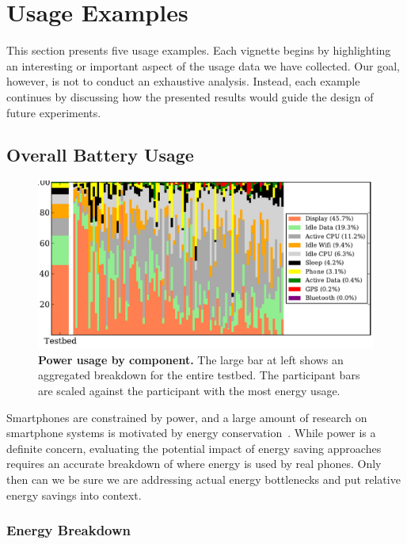 \section{Usage Examples}
\label{sec-usage}

This section presents five \PhoneLab{} usage examples. Each vignette begins by
highlighting an interesting or important aspect of the usage data we have
collected. Our goal, however, is not to conduct an exhaustive analysis.
Instead, each example continues by discussing how the presented results would
guide the design of future \PhoneLab{} experiments.

\subsection{Overall Battery Usage}
\label{subsec-batteryoverview}

\begin{figure}[t]
\includegraphics[width=\textwidth]{./figures/power/breakdown/graph.pdf}
\caption{\textbf{Power usage by component.} The large bar at left shows an
aggregated breakdown for the entire testbed. The participant bars are scaled
against the participant with the most energy usage.}
\label{figure-batteryoverview}
\end{figure}

Smartphones are constrained by power, and a large amount of research on
smartphone systems is motivated by energy
conservation~\cite{shye:micro:2009,banerjee:ubicomp:2007,ace-mobisys12}.
While power is a definite concern, evaluating the potential impact of energy
saving approaches requires an accurate breakdown of where energy is used by
real phones. Only then can we be sure we are addressing actual energy
bottlenecks and put relative energy savings into context.

\subsubsection{Energy Breakdown}

